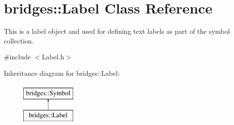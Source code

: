 \hypertarget{classbridges_1_1_label}{}\section{bridges\+::Label Class Reference}
\label{classbridges_1_1_label}


This is a label object and used for defining text labels as part of the symbol collection.  




{\ttfamily \#include $<$Label.\+h$>$}

Inheritance diagram for bridges\+::Label\+:\begin{figure}[H]
\begin{center}
\leavevmode
\includegraphics[height=2.000000cm]{classbridges_1_1_label}
\end{center}
\end{figure}
